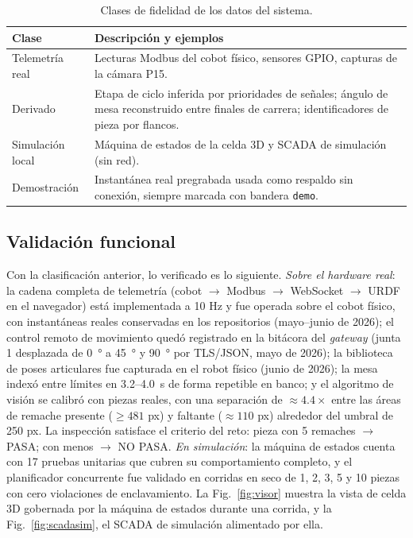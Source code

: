\documentclass{styles/svproc}
\begin{document}
\begin{table}[t]
  \caption{Clases de fidelidad de los datos del sistema.}
  \label{tab:fidelidad}
  \centering
  \scriptsize
  \begin{tabular}{@{}lp{}@{}}
    \toprule
    Clase & Descripción y ejemplos \\
    \midrule
    Telemetría real & Lecturas Modbus del cobot físico, sensores GPIO, capturas de la cámara P15. \\
    Derivado & Etapa de ciclo inferida por prioridades de señales; ángulo de mesa reconstruido entre finales de carrera; identificadores de pieza por flancos. \\
    Simulación local & Máquina de estados de la celda 3D y SCADA de simulación (sin red). \\
    Demostración & Instantánea real pregrabada usada como respaldo sin conexión, siempre marcada con bandera \texttt{demo}. \\
    \bottomrule
  \end{tabular}
\end{table}

\subsection{Validación funcional}
Con la clasificación anterior, lo verificado es lo siguiente.
\emph{Sobre el hardware real}: la cadena completa de telemetría (cobot
$\to$ Modbus $\to$ WebSocket $\to$ URDF en el navegador) está implementada
a 10 Hz y fue operada sobre el cobot físico, con instantáneas reales
conservadas en los repositorios (mayo--junio de 2026); el control remoto de
movimiento quedó registrado en la bitácora del \emph{gateway} (junta 1
desplazada de \SI{0}{\degree} a \SI{45}{\degree} y \SI{90}{\degree} por
TLS/JSON, mayo de 2026); la biblioteca de poses articulares fue capturada
en el robot físico (junio de 2026); la mesa indexó entre límites en
3.2--\SI{4.0}{\second} de forma repetible en banco; y el algoritmo de
visión se calibró con piezas reales, con una separación de
${\approx}4.4\times$ entre las áreas de remache presente ($\geq 481$ px) y
faltante ($\approx 110$ px) alrededor del umbral de 250 px. La inspección
satisface el criterio del reto: pieza con 5 remaches $\to$ PASA; con menos
$\to$ NO PASA. \emph{En simulación}: la máquina de estados cuenta con 17
pruebas unitarias que cubren su comportamiento completo, y el planificador
concurrente fue validado en corridas en seco de 1, 2, 3, 5 y 10 piezas con
cero violaciones de enclavamiento. La Fig.~\ref{fig:visor} muestra la vista
de celda 3D gobernada por la máquina de estados durante una corrida, y la
Fig.~\ref{fig:scadasim}, el SCADA de simulación alimentado por ella.
\end{document}

